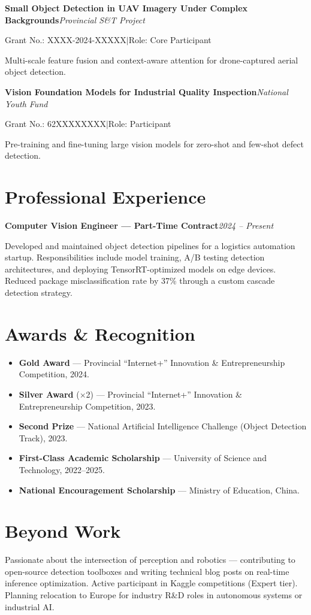 \documentclass[11pt,a4paper]{article}
\newcommand{\cventry}[3]{%
    \textbf{#1}\hfill\textit{#2}\par\vspace{2pt}%
    #3\par\vspace{7pt}%
}
\begin{document}
\cventry{Small Object Detection in UAV Imagery Under Complex Backgrounds}{Provincial S\&T Project}{%
    Grant No.: XXXX-2024-XXXXX\enspace$|$\enspace Role: Core Participant\par
    {\small Multi-scale feature fusion and context-aware attention for drone-captured aerial object detection.}
}

\cventry{Vision Foundation Models for Industrial Quality Inspection}{National Youth Fund}{%
    Grant No.: 62XXXXXXXX\enspace$|$\enspace Role: Participant\par
    {\small Pre-training and fine-tuning large vision models for zero-shot and few-shot defect detection.}
}

\section{Professional Experience}

\cventry{Computer Vision Engineer --- Part-Time Contract}{2024 -- Present}{%
    Developed and maintained object detection pipelines for a logistics automation startup. Responsibilities include model training, A/B testing detection architectures, and deploying TensorRT-optimized models on edge devices. Reduced package misclassification rate by 37\% through a custom cascade detection strategy.
}

\section{Awards \& Recognition}

\begin{itemize}[leftmargin=14pt, nosep, topsep=2pt, itemsep=3pt]
    \item \textbf{Gold Award} --- Provincial ``Internet+'' Innovation \& Entrepreneurship Competition, 2024.
    \item \textbf{Silver Award} ($\times$2) --- Provincial ``Internet+'' Innovation \& Entrepreneurship Competition, 2023.
    \item \textbf{Second Prize} --- National Artificial Intelligence Challenge (Object Detection Track), 2023.
    \item \textbf{First-Class Academic Scholarship} --- University of Science and Technology, 2022--2025.
    \item \textbf{National Encouragement Scholarship} --- Ministry of Education, China.
\end{itemize}

\section{Beyond Work}

Passionate about the intersection of perception and robotics --- contributing to open-source detection toolboxes and writing technical blog posts on real-time inference optimization. Active participant in Kaggle competitions (Expert tier). Planning relocation to Europe for industry R\&D roles in autonomous systems or industrial AI.
\end{document}
